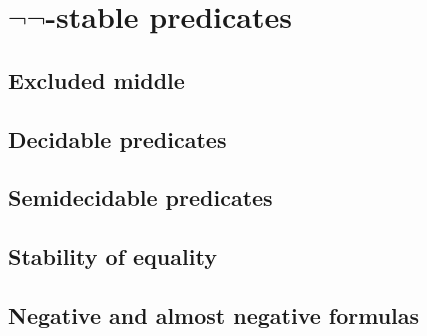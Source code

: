 \section[\texorpdfstring{$\neg\neg$-stable predicates}{Not-not-stable predicates}]{$\neg\neg$-stable predicates}
\label{sec:decidable-predicates}

\subsection{Excluded middle}
\label{sec:excluded-middle}

\subsection{Decidable predicates}
\label{sec:decidable-predicates-1}

\subsection{Semidecidable predicates}
\label{sec:semid-pred}

\subsection{Stability of equality}
\label{sec:stability-equality}

\subsection{Negative and almost negative formulas}
\label{sec:negat-almost-negat}



